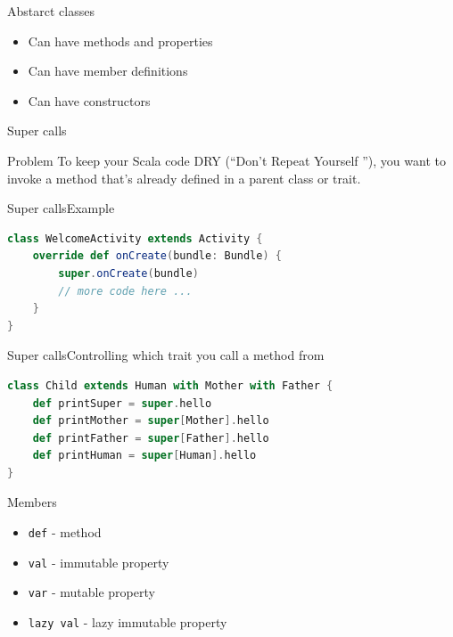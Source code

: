 \documentclass[aspectratio=169]{beamer}
\begin{document}
\begin{frame}{Abstarct classes}
  \begin{itemize}
    \item Can have methods and properties
    \item Can have member definitions
    \item \alert{Can} have constructors
  \end{itemize}
\end{frame}

\begin{frame}{Super calls}
  \begin{block}{Problem}
    To keep your Scala code DRY (“Don’t Repeat Yourself ”), you want to invoke a method that’s
    already defined in a parent class or trait.
  \end{block}
\end{frame}

\begin{frame}[fragile]{Super calls}{Example}
\begin{lstlisting}[style=scala,language=scala]
class WelcomeActivity extends Activity {
    override def onCreate(bundle: Bundle) {
        super.onCreate(bundle)
        // more code here ...
    }
}
\end{lstlisting}
\end{frame}

\begin{frame}[fragile]{Super calls}{Controlling which trait you call a method from}
\begin{lstlisting}[style=scala,language=scala]
class Child extends Human with Mother with Father {
    def printSuper = super.hello
    def printMother = super[Mother].hello
    def printFather = super[Father].hello
    def printHuman = super[Human].hello
}
\end{lstlisting}
\end{frame}

\begin{frame}{Members}
\begin{itemize}
  \item \texttt{def} - method
  \item \texttt{val} - immutable property
  \item \texttt{var} - mutable property
  \item \texttt{lazy val} - lazy immutable property
\end{itemize}
\end{frame}
\end{document}
